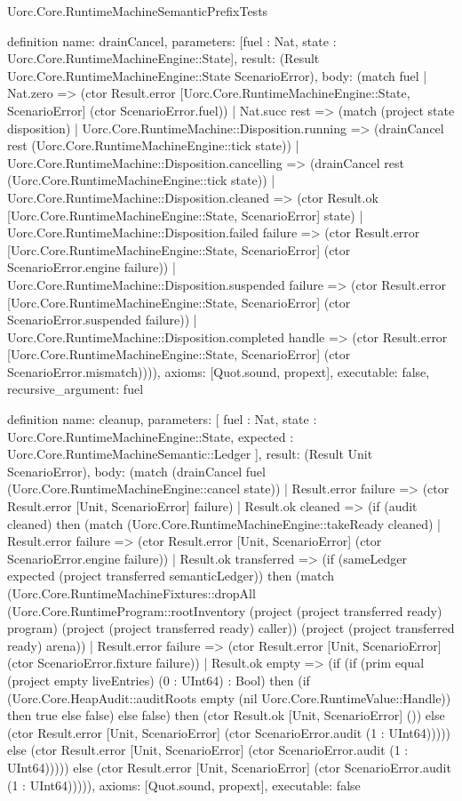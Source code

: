 \begin{lexlean}{Uorc.Core.RuntimeMachineSemanticPrefixTests}
\begin{semanticmodule}
definition{
  name: drainCancel,
  parameters: [fuel : Nat, state : Uorc.Core.RuntimeMachineEngine::State],
  result: (Result Uorc.Core.RuntimeMachineEngine::State ScenarioError),
  body: (match fuel
    | Nat.zero => (ctor Result.error [Uorc.Core.RuntimeMachineEngine::State, ScenarioError] (ctor ScenarioError.fuel))
    | Nat.succ rest => (match (project state disposition)
      | Uorc.Core.RuntimeMachine::Disposition.running => (drainCancel rest (Uorc.Core.RuntimeMachineEngine::tick state))
      | Uorc.Core.RuntimeMachine::Disposition.cancelling => (drainCancel rest (Uorc.Core.RuntimeMachineEngine::tick state))
      | Uorc.Core.RuntimeMachine::Disposition.cleaned => (ctor Result.ok [Uorc.Core.RuntimeMachineEngine::State, ScenarioError] state)
      | Uorc.Core.RuntimeMachine::Disposition.failed failure => (ctor Result.error [Uorc.Core.RuntimeMachineEngine::State, ScenarioError] (ctor ScenarioError.engine failure))
      | Uorc.Core.RuntimeMachine::Disposition.suspended failure => (ctor Result.error [Uorc.Core.RuntimeMachineEngine::State, ScenarioError] (ctor ScenarioError.suspended failure))
      | Uorc.Core.RuntimeMachine::Disposition.completed handle => (ctor Result.error [Uorc.Core.RuntimeMachineEngine::State, ScenarioError] (ctor ScenarioError.mismatch)))),
  axioms: [Quot.sound, propext],
  executable: false,
  recursive_argument: fuel
}

definition{
  name: cleanup,
  parameters: [
    fuel : Nat,
    state : Uorc.Core.RuntimeMachineEngine::State,
    expected : Uorc.Core.RuntimeMachineSemantic::Ledger
  ],
  result: (Result Unit ScenarioError),
  body: (match (drainCancel fuel (Uorc.Core.RuntimeMachineEngine::cancel state))
    | Result.error failure => (ctor Result.error [Unit, ScenarioError] failure)
    | Result.ok cleaned => (if (audit cleaned) then (match (Uorc.Core.RuntimeMachineEngine::takeReady cleaned)
      | Result.error failure => (ctor Result.error [Unit, ScenarioError] (ctor ScenarioError.engine failure))
      | Result.ok transferred => (if (sameLedger expected (project transferred semanticLedger)) then (match (Uorc.Core.RuntimeMachineFixtures::dropAll (Uorc.Core.RuntimeProgram::rootInventory (project (project transferred ready) program) (project (project transferred ready) caller)) (project (project transferred ready) arena))
        | Result.error failure => (ctor Result.error [Unit, ScenarioError] (ctor ScenarioError.fixture failure))
        | Result.ok empty => (if (if (prim equal (project empty liveEntries) (0 : UInt64) : Bool) then (if (Uorc.Core.HeapAudit::auditRoots empty (nil Uorc.Core.RuntimeValue::Handle)) then true else false) else false) then (ctor Result.ok [Unit, ScenarioError] ()) else (ctor Result.error [Unit, ScenarioError] (ctor ScenarioError.audit (1 : UInt64))))) else (ctor Result.error [Unit, ScenarioError] (ctor ScenarioError.audit (1 : UInt64))))) else (ctor Result.error [Unit, ScenarioError] (ctor ScenarioError.audit (1 : UInt64))))),
  axioms: [Quot.sound, propext],
  executable: false
}


\end{semanticmodule}
\end{lexlean}
